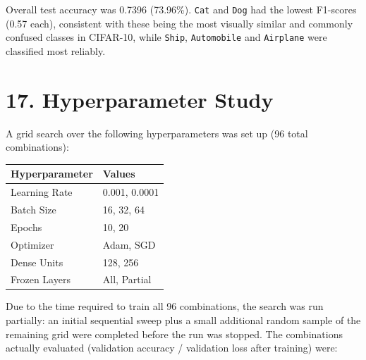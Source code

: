 \documentclass[11pt]{article}
\begin{document}
Overall test accuracy was 0.7396 (73.96\%). \texttt{Cat} and \texttt{Dog}
had the lowest F1-scores (0.57 each), consistent with these being the
most visually similar and commonly confused classes in CIFAR-10, while
\texttt{Ship}, \texttt{Automobile} and \texttt{Airplane} were classified
most reliably.


\section*{17. Hyperparameter Study}

A grid search over the following hyperparameters was set up (96 total
combinations):

\begin{center}

\begin{tabular}{|l|l|}

\hline

Hyperparameter & Values\\

\hline

Learning Rate &
0.001, 0.0001\\

\hline

Batch Size &
16, 32, 64\\

\hline

Epochs &
10, 20\\

\hline

Optimizer &
Adam, SGD\\

\hline

Dense Units &
128, 256\\

\hline

Frozen Layers &
All, Partial\\

\hline

\end{tabular}

\end{center}

Due to the time required to train all 96 combinations, the search was
run partially: an initial sequential sweep plus a small additional random
sample of the remaining grid were completed before the run was stopped.
The combinations actually evaluated (validation accuracy / validation
loss after training) were:
\end{document}

